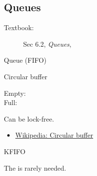 \subsection{Queues}
\label{sec:queues}
\begin{description}
\item[Textbook:] Sec 6.2, \emph{Queues}, \cite{love2010linux}
\end{description}
\begin{frame}{Queue (FIFO)}
  \begin{block}{Circular buffer}
    \begin{center}
       
    \end{center}
    \begin{description}
    \item[Empty:] 
    \item[Full:] 
    \end{description}
  \end{block}
  Can be lock-free.
\end{frame}

\begin{itemize}
\item \href{http://en.wikipedia.org/wiki/Circular_buffer}{Wikipedia: Circular buffer}
\end{itemize}

\begin{frame}{KFIFO}
  \begin{block}{}
    \begin{center}
    \end{center}
  \end{block}
  The  is rarely needed.
\end{frame}

